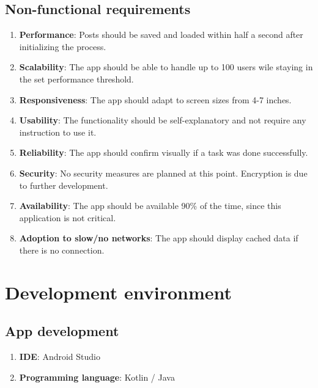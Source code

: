 \documentclass[conference]{IEEEtran}
\numberwithin{figure}{subsection}
\begin{document}
\subsection{Non-functional requirements}
\begin{enumerate}
 \item \textbf{Performance}: Posts should be saved and loaded within half a second after initializing the process.
 \newline
 \item \textbf{Scalability}: The app should be able to handle up to 100 users wile staying in the set performance threshold.
 \newline
 \item \textbf{Responsiveness}: The app should adapt to screen sizes from 4-7 inches.
 \newline
 \item \textbf{Usability}: The functionality should be self-explanatory and not require any instruction to use it.
 \newline
 \item \textbf{Reliability}: The app should confirm visually if a task was done successfully.
 \newline
 \item \textbf{Security}: No security measures are planned at this point. Encryption is due to further development.
 \newline
 \item \textbf{Availability}: The app should be available 90\% of the time, since this application is not critical.
 \newline
 \item \textbf{Adoption to slow/no networks}: The app should display cached data if there is no connection.
 \newline
\end{enumerate}


\section{Development environment}
\subsection{App development}
\begin{enumerate}
 \item \textbf{IDE}: Android Studio
 \newline
 \item \textbf{Programming language}: Kotlin / Java
 \newline
 \end{enumerate}
\end{document}
